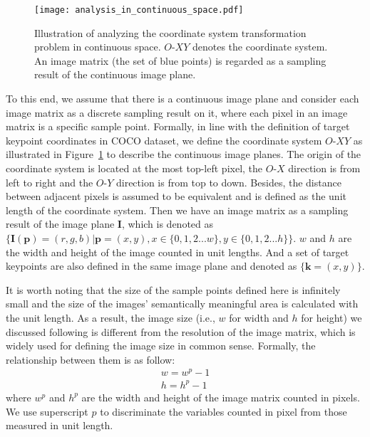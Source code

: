 \documentclass[10pt,journal,compsoc]{IEEEtran}
\begin{document}
\begin{figure}[h]
    \centering
    \texttt{[image: analysis\_in\_continuous\_space.pdf]}
    \caption{Illustration of analyzing the coordinate system transformation problem in continuous space. $O\text{-}XY$ denotes the coordinate system. An image matrix (the set of blue points) is regarded as a sampling result of the continuous image plane.}
    \label{fig:analysis_in_continuous_space}
\end{figure}

To this end, we assume that there is a continuous image plane and consider each image matrix as a discrete sampling result on it, where each pixel in an image matrix is a specific sample point. Formally, in line with the definition of target keypoint coordinates in COCO dataset\cite{COCO}, we define the coordinate system $O\text{-}XY$ as illustrated in Figure~\ref{fig:analysis_in_continuous_space} to describe the continuous image planes. The origin of the coordinate system is located at the most top-left pixel, the $O\text{-}X$ direction is from left to right and the $O\text{-}Y$ direction is from top to down. Besides, the distance between adjacent pixels is assumed to be equivalent and is defined as the unit length of the coordinate system. Then we have an image matrix as a sampling result of the image plane $\textbf{I}$, which is denoted as $\{\textbf{I}(\textbf{p})=(r,g,b)|\textbf{p}=(x,y), x\in\{0,1,2...w\}, y\in\{0,1,2...h\}\}$. $w$ and $h$ are the width and height of the image counted in unit lengths. And a set of target keypoints are also defined in the same image plane and denoted as $\{\textbf{k}=(x,y)\}$.

It is worth noting that the size of the sample points defined here is infinitely small and the size of the images' semantically meaningful area is calculated with the unit length. As a result, the image size (i.e., $w$ for width and $h$ for height) we discussed following is different from the resolution of the image matrix, which is widely used for defining the image size in common sense. Formally, the relationship between them is as follow:
\begin{equation}
    \begin{split}
     w = w^p - 1\\
     h = h^p - 1
    \end{split}
\end{equation}
where $w^p$ and $h^p$ are the width and height of the image matrix counted in pixels. We use superscript $p$ to discriminate the variables counted in pixel from those measured in unit length.
\end{document}
